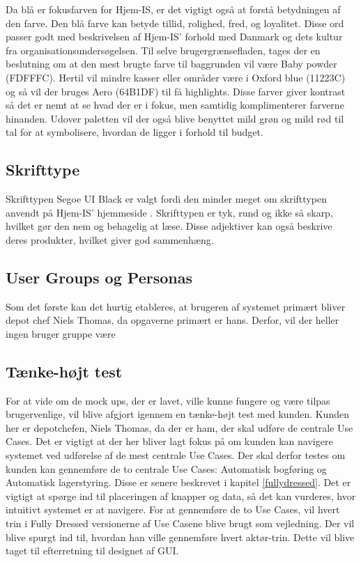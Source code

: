Da blå er fokusfarven for Hjem-IS, er det vigtigt også at forstå betydningen af den farve. Den blå farve kan betyde tillid, rolighed, fred, og loyalitet. Disse ord passer godt med beskrivelsen af Hjem-IS' forhold med Danmark og dets kultur fra organisationsundersøgelsen. Til selve brugergrænsefladen, tages der en beslutning om at den mest brugte farve til baggrunden vil være Baby powder (FDFFFC). Hertil vil mindre kasser eller områder være i Oxford blue (11223C) og så vil der bruges Aero (64B1DF) til få highlights. Disse farver giver kontrast så det er nemt at se hvad der er i fokus, men samtidig komplimenterer farverne hinanden. Udover paletten vil der også blive benyttet mild grøn og mild rød til tal for at symbolisere, hvordan de ligger i forhold til budget.

\subsection{Skrifttype}
Skrifttypen Segoe UI Black er valgt fordi den minder meget om skrifttypen anvendt på Hjem-IS' hjemmeside \cite{hjemis}. Skrifttypen er tyk, rund og ikke så skarp, hvilket gør den nem og behagelig at læse. Disse adjektiver kan også beskrive deres produkter, hvilket giver god sammenhæng.

\subsection{User Groups og Personas}
Som det første kan det hurtig etableres, at brugeren af systemet primært bliver depot chef Niels Thomas, da opgaverne primært er hans. Derfor, vil der heller ingen bruger gruppe være

\subsection{Tænke-højt test}
For at vide om de mock ups, der er lavet, ville kunne fungere og være tilpas brugervenlige, vil blive afgjort igennem en tænke-højt test med kunden. Kunden her er depotchefen, Niels Thomas, da der er ham, der skal udføre de centrale Use Cases. Det er vigtigt at der her bliver lagt fokus på om kunden kan navigere systemet ved udførelse af de mest centrale Use Cases. Der skal derfor testes om kunden kan gennemføre de to centrale Use Cases: Automatisk bogføring og Automatisk lagerstyring. Disse er senere beskrevet i kapitel \ref{fullydressed}. Det er vigtigt at spørge ind til placeringen af knapper og data, så det kan vurderes, hvor intuitivt systemet er at navigere. For at gennemføre de to Use Cases, vil hvert trin i Fully Dressed versionerne af Use Casene blive brugt som vejledning. Der vil blive spurgt ind til, hvordan han ville gennemføre hvert aktør-trin. Dette vil blive taget til efterretning til designet af GUI.

